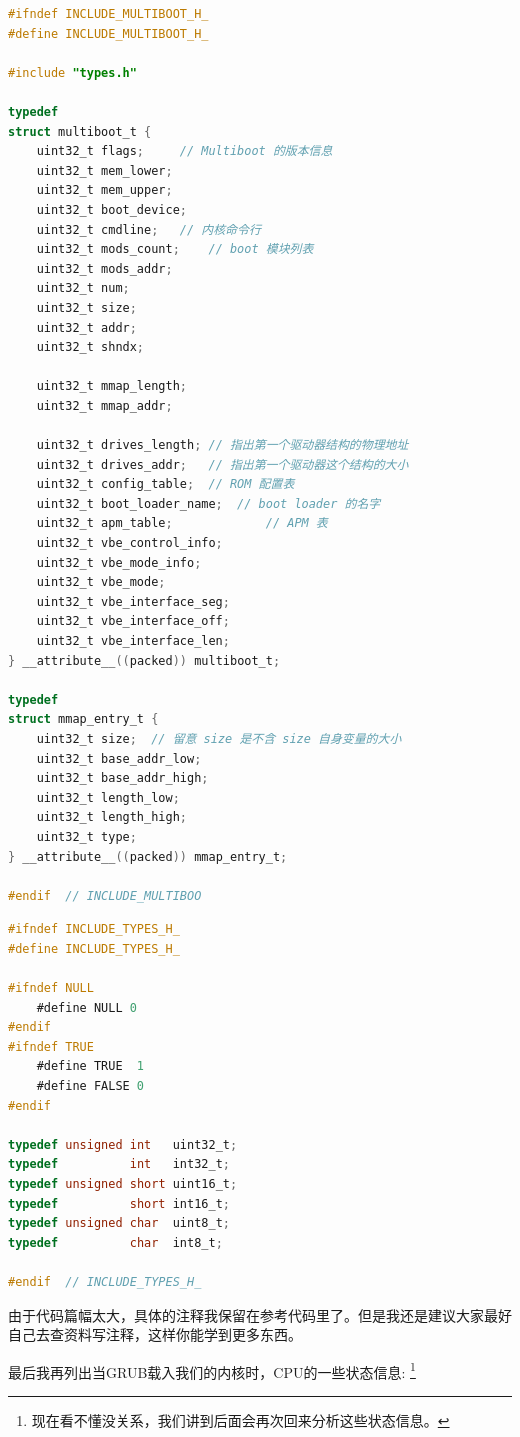 \begin{lstlisting}[language = C, label = include/multiboot.h, caption = include/multiboot.h]
#ifndef INCLUDE_MULTIBOOT_H_
#define INCLUDE_MULTIBOOT_H_

#include "types.h"

typedef
struct multiboot_t {
	uint32_t flags;		// Multiboot 的版本信息
	uint32_t mem_lower;
	uint32_t mem_upper;
	uint32_t boot_device;
	uint32_t cmdline;	// 内核命令行
	uint32_t mods_count;	// boot 模块列表
	uint32_t mods_addr;
	uint32_t num;
	uint32_t size;
	uint32_t addr;
	uint32_t shndx;

	uint32_t mmap_length;		
	uint32_t mmap_addr;
	
	uint32_t drives_length; // 指出第一个驱动器结构的物理地址	
	uint32_t drives_addr; 	// 指出第一个驱动器这个结构的大小
	uint32_t config_table; 	// ROM 配置表
	uint32_t boot_loader_name; 	// boot loader 的名字
	uint32_t apm_table; 	    	// APM 表
	uint32_t vbe_control_info;
	uint32_t vbe_mode_info;
	uint32_t vbe_mode;
	uint32_t vbe_interface_seg;
	uint32_t vbe_interface_off;
	uint32_t vbe_interface_len;
} __attribute__((packed)) multiboot_t;

typedef
struct mmap_entry_t {
	uint32_t size; 	// 留意 size 是不含 size 自身变量的大小
	uint32_t base_addr_low;
	uint32_t base_addr_high;
	uint32_t length_low;
	uint32_t length_high;
	uint32_t type;
} __attribute__((packed)) mmap_entry_t;

#endif 	// INCLUDE_MULTIBOO
\end{lstlisting}

\begin{lstlisting}[language = C, label = include/types.h, caption = include/types.h]
#ifndef INCLUDE_TYPES_H_
#define INCLUDE_TYPES_H_

#ifndef NULL
	#define NULL 0
#endif
#ifndef TRUE
	#define TRUE  1
	#define FALSE 0
#endif

typedef unsigned int   uint32_t;
typedef          int   int32_t;
typedef unsigned short uint16_t;
typedef          short int16_t;
typedef unsigned char  uint8_t;
typedef          char  int8_t;

#endif 	// INCLUDE_TYPES_H_
\end{lstlisting}

\par 由于代码篇幅太大，具体的注释我保留在参考代码里了。但是我还是建议大家最好自己去查资料写注释，这样你能学到更多东西。
\par 最后我再列出当GRUB载入我们的内核时，CPU的一些状态信息:\allowbreak
\footnote{现在看不懂没关系，我们讲到后面会再次回来分析这些状态信息。}

